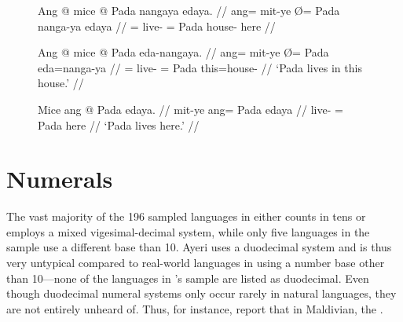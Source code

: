 \begin{figure}[h]
\pex
\a\ljudge*\label{ex:edayamod}\begingl
	\gla Ang @ mice {} @ Pada nangaya edaya. //
	\glb ang= mit-ye Ø= Pada nanga-ya edaya //
	\glc \AgtT{}= live-\TsgF{} \Top{}= Pada house-\Loc{} here //
\endgl

\a\label{ex:edanp}\begingl
	\gla Ang @ mice {} @ Pada eda-nangaya. //
	\glb ang= mit-ye Ø= Pada eda=nanga-ya //
	\glc \AgtT{}= live-\TsgF{} \Top{}= Pada this=house-\Loc{} //
	\glft `Pada lives in this house.' //
\endgl

\a\label{ex:edanyapro}\begingl
	\gla Mice ang @ Pada edaya. //
	\glb mit-ye ang= Pada edaya //
	\glc live-\TsgF{} \Aarg{}= Pada here //
	\glft `Pada lives here.' //
\endgl
\xe
\end{figure}


\section{Numerals}
\label{sec:numerals}

The vast majority of the 196 sampled languages in \citet{wals131} either counts
in tens or employs a mixed vigesimal-decimal system, while only five languages
in the sample use a different base than 10. Ayeri uses a duodecimal system and
is thus very untypical compared to real-world languages in using a number base
other than 10---none of the languages in \citet{wals131}'s sample are listed as
duodecimal.
Even though duodecimal numeral systems only occur rarely in natural languages,
they are not entirely unheard of. Thus, for instance, \citet{caingair2000}
report that in Maldivian, the .

